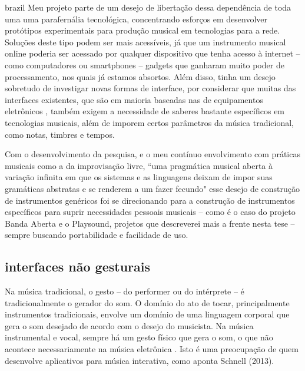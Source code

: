 \begin{otherlanguage*}{brazil}
Meu projeto parte de um desejo de libertação dessa dependência de toda uma uma parafernália tecnológica, concentrando esforços em desenvolver protótipos experimentais para produção musical em tecnologias para a rede. Soluções deste tipo podem ser mais acessíveis, já que um instrumento musical online poderia ser acessado por qualquer dispositivo que tenha acesso à internet -- como computadores ou smartphones -- gadgets que ganharam muito poder de processamento, nos quais já estamos absortos. Além disso, tinha um desejo sobretudo de investigar novas formas de interface, por considerar que muitas das interfaces existentes, que são em maioria baseadas nas de equipamentos eletrônicos \cite{Stolfi2016}, também exigem a necessidade de saberes bastante específicos em tecnologias musicais, além de imporem certos parâmetros da música tradicional, como notas, timbres e tempos. 

Com o desenvolvimento da pesquisa, e o meu contínuo envolvimento com práticas musicais como a da improvisação livre, ``uma pragmática musical aberta à variação infinita em que os sistemas e as linguagens deixam de impor suas gramáticas abstratas e se renderem a um fazer fecundo" \cite[2]{Costa2016} esse desejo de construção de instrumentos genéricos foi se direcionando para a construção de instrumentos específicos para suprir necessidades pessoais musicais -- como é o caso do projeto Banda Aberta e o Playsound, projetos que descreverei mais a frente nesta tese -- sempre buscando portabilidade e facilidade de uso.


\subsection{interfaces não gesturais}

Na música tradicional, o gesto -- do performer ou do intérprete -- é tradicionalmente o gerador do som. O domínio do ato de tocar, principalmente instrumentos tradicionais, envolve um domínio de uma linguagem corporal que gera o som desejado de acordo com o desejo do musicista. Na música instrumental e vocal, sempre há um gesto físico que gera o som, o que não acontece necessariamente na música eletrônica \cite[85]{Smalley1996}. Isto é uma preocupação de quem desenvolve aplicativos para música interativa, como aponta Schnell (2013). 



\end{otherlanguage*}

